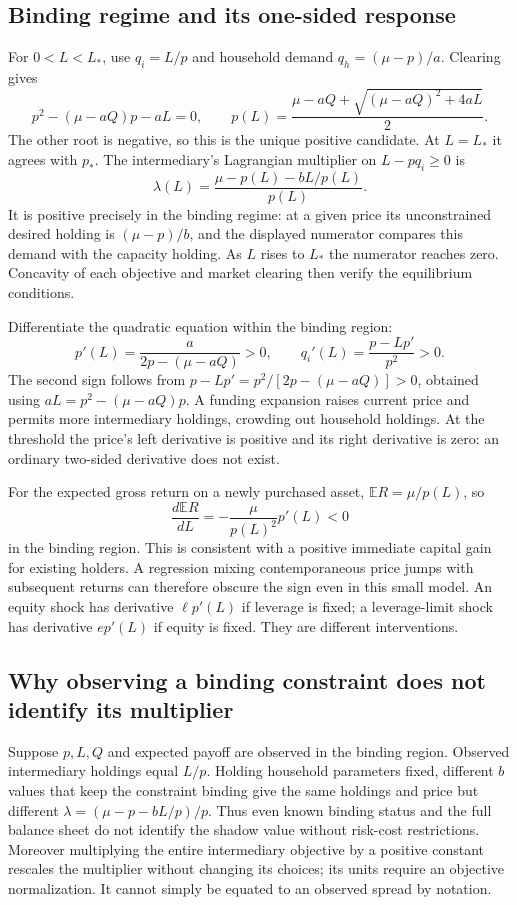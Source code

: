 \documentclass[11pt]{article}
\newcommand{\E}{\mathbb E}
\begin{document}
\subsection*{Binding regime and its one-sided response}
For $0<L<L_*$, use $q_i=L/p$ and household demand
$q_h=(\mu-p)/a$. Clearing gives
\[
 p^2-(\mu-aQ)p-aL=0,
 \qquad
 p(L)=\frac{\mu-aQ+\sqrt{(\mu-aQ)^2+4aL}}2.
\]
The other root is negative, so this is the unique positive candidate.
At $L=L_*$ it agrees with $p_*$. The intermediary's Lagrangian multiplier
on $L-pq_i\geq0$ is
\[
 \lambda(L)=\frac{\mu-p(L)-bL/p(L)}{p(L)}.
\]
It is positive precisely in the binding regime: at a given price its
unconstrained desired holding is $(\mu-p)/b$, and the displayed numerator
compares this demand with the capacity holding. As $L$ rises to $L_*$
the numerator reaches zero. Concavity of each objective and market clearing
then verify the equilibrium conditions.

Differentiate the quadratic equation within the binding region:
\[
 p'(L)=\frac{a}{2p-(\mu-aQ)}>0,\qquad
 q_i'(L)=\frac{p-Lp'}{p^2}>0.
\]
The second sign follows from
$p-Lp'=p^2/[2p-(\mu-aQ)]>0$, obtained using
$aL=p^2-(\mu-aQ)p$. A funding expansion raises current price and permits
more intermediary holdings, crowding out household holdings. At the
threshold the price's left derivative is positive and its right derivative
is zero: an ordinary two-sided derivative does not exist.

For the expected gross return on a newly purchased asset,
$\E R=\mu/p(L)$, so
\[
 \frac{d\E R}{dL}=-\frac{\mu}{p(L)^2}p'(L)<0
\]
in the binding region. This is consistent with a positive immediate capital
gain for existing holders. A regression mixing contemporaneous price jumps
with subsequent returns can therefore obscure the sign even in this small
model. An equity shock has derivative $\ell p'(L)$ if leverage is fixed;
a leverage-limit shock has derivative $e p'(L)$ if equity is fixed.
They are different interventions.

\subsection*{Why observing a binding constraint does not identify its multiplier}
Suppose $p,L,Q$ and expected payoff are observed in the binding region.
Observed intermediary holdings equal $L/p$. Holding household parameters
fixed, different $b$ values that keep the constraint binding give the same
holdings and price but different
$\lambda=(\mu-p-bL/p)/p$. Thus even known binding status and the full
balance sheet do not identify the shadow value without risk-cost
restrictions. Moreover multiplying the entire intermediary objective by a
positive constant rescales the multiplier without changing its choices;
its units require an objective normalization. It cannot simply be equated
to an observed spread by notation.
\end{document}
